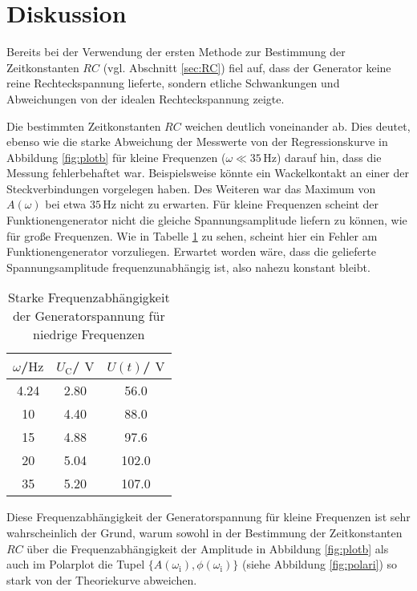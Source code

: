 \section{Diskussion}
\label{sec:Diskussion}
Bereits bei der Verwendung der ersten Methode zur Bestimmung der Zeitkonstanten $RC$ (vgl. Abschnitt \ref{sec:RC}) fiel %
auf, dass der Generator keine reine Rechteckspannung lieferte, sondern etliche Schwankungen und Abweichungen von der idealen Rechteckspannung zeigte.

Die bestimmten Zeitkonstanten $RC$ weichen deutlich voneinander ab. Dies deutet, ebenso wie die starke Abweichung der Messwerte von der Regressionskurve
in Abbildung \ref{fig:plotb} für kleine Frequenzen ($\omega \ll 35\,\si{\Hz}$) darauf hin, dass die Messung fehlerbehaftet war. Beispielsweise könnte ein Wackelkontakt an einer der Steckverbindungen vorgelegen haben.
Des Weiteren war das Maximum von $A(\omega)$ bei etwa $35 \,\si{\Hz}$ nicht zu erwarten. Für kleine Frequenzen scheint der Funktionengenerator nicht die gleiche Spannungsamplitude liefern zu können, wie für große Frequenzen.
Wie in Tabelle \ref{tab:diskussion} zu sehen, scheint hier ein Fehler am Funktionengenerator vorzuliegen. Erwartet worden wäre, dass die gelieferte Spannungsamplitude frequenzunabhängig ist, also nahezu konstant bleibt.

\begin{table}
	\centering
	\caption{Starke Frequenzabhängigkeit der Generatorspannung für niedrige Frequenzen}
	\label{tab:diskussion}
	\begin{tabular}{ccc}
		\toprule
		$\omega$/$\si{\Hz}$ & $U_\text{C}$/ $\si{\volt}$ & $U(t)$/ $\si{\volt}$ \\
		\midrule
		4.24                & 2.80                       & 56.0                 \\
		10                  & 4.40                       & 88.0                 \\
		15                  & 4.88                       & 97.6                 \\
		20                  & 5.04                       & 102.0                \\
		35                  & 5.20                       & 107.0                \\
		\bottomrule
	\end{tabular}
\end{table}
Diese Frequenzabhängigkeit der Generatorspannung für kleine Frequenzen ist sehr wahrscheinlich der Grund, warum sowohl in der Bestimmung der Zeitkonstanten $RC$ über die Frequenzabhängigkeit der Amplitude in
Abbildung \ref{fig:plotb} als auch im Polarplot die Tupel $\{A(\omega_{\text{i}}), \phi(\omega_{\text{i}}) \}$ (siehe Abbildung \ref{fig:polari}) so stark von der Theoriekurve abweichen.

